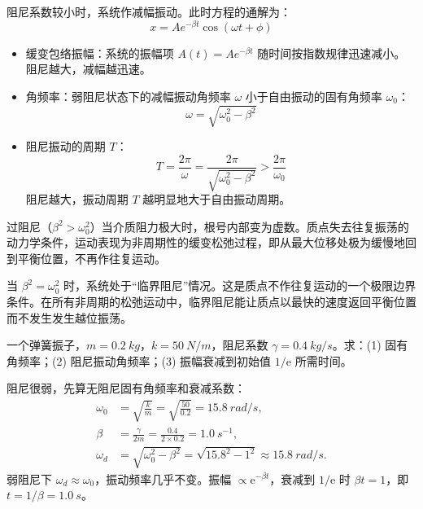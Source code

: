 \begin{definition}[弱阻尼]
阻尼系数较小时，系统作减幅振动。此时方程的通解为：$$\boxed{x = A e^{-\beta t} \cos(\omega t + \phi)}$$
    \begin{itemize}
    \item 缓变包络振幅：系统的振幅项 $A(t) = A e^{-\beta t}$ 随时间按指数规律迅速减小。阻尼越大，减幅越迅速。
    \item 角频率：弱阻尼状态下的减幅振动角频率 $\omega$ 小于自由振动的固有角频率 $\omega_0$：$$\omega = \sqrt{\omega_0^2 - \beta^2}$$
    \item 阻尼振动的周期 $T$：$$T = \frac{2\pi}{\omega} = \frac{2\pi}{\sqrt{\omega_0^2 - \beta^2}} > \frac{2\pi}{\omega_0}$$阻尼越大，振动周期 $T$ 越明显地大于自由振动周期。
    \end{itemize}
\end{definition}
\begin{definition}[强阻尼]
过阻尼（$\beta^2 > \omega_0^2$）当介质阻力极大时，根号内部变为虚数。质点失去往复振荡的动力学条件，运动表现为非周期性的缓变松弛过程，即从最大位移处极为缓慢地回到平衡位置，不再作往复运动。
\end{definition}
\begin{definition}[临界阻尼]
当 $\beta^2 = \omega_0^2$ 时，系统处于“临界阻尼”情况。这是质点不作往复运动的一个极限边界条件。在所有非周期的松弛运动中，临界阻尼能让质点以最快的速度返回平衡位置而不发生发生越位振荡。
\end{definition}


\begin{exercise}
一个弹簧振子，\(m=\SI{0.2}{kg}\)，\(k=\SI{50}{N/m}\)，阻尼系数 \(\gamma=\SI{0.4}{kg/s}\)。求：(1) 固有角频率；(2) 阻尼振动角频率；(3) 振幅衰减到初始值 \(1/\mathrm{e}\) 所需时间。
\end{exercise}
\begin{solution}
阻尼很弱，先算无阻尼固有角频率和衰减系数：
\[
\begin{aligned}
\omega_0&=\sqrt{\frac{k}{m}}=\sqrt{\frac{50}{0.2}}=\SI{15.8}{rad/s},\\
\beta&=\frac{\gamma}{2m}=\frac{0.4}{2\times0.2}=\SI{1.0}{s^{-1}},\\
\omega_d&=\sqrt{\omega_0^2-\beta^2}
=\sqrt{15.8^2-1^2}\approx\SI{15.8}{rad/s}.
\end{aligned}
\]
弱阻尼下 \(\omega_d\approx\omega_0\)，振动频率几乎不变。振幅 \(\propto\mathrm{e}^{-\beta t}\)，衰减到 \(1/\mathrm{e}\) 时 \(\beta t=1\)，即 \(t=1/\beta=\SI{1.0}{s}\)。
\end{solution}
